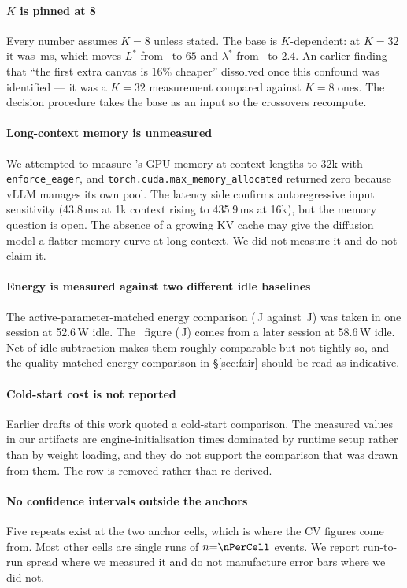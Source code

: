 \paragraph{$K$ is pinned at 8}
Every number assumes $K{=}8$ unless stated. The base is $K$-dependent: at
$K{=}32$ it was \dgOldBase\,ms, which moves $L^{*}$ from \crossoverL\ to $65$
and $\lambda^{*}$ from \crossoverLambda\ to $2.4$. An earlier finding that
``the first extra canvas is 16\% cheaper'' dissolved once this confound was
identified --- it was a $K{=}32$ measurement compared against $K{=}8$ ones.
The decision procedure takes the base as an input so the crossovers recompute.

\paragraph{Long-context memory is unmeasured}
We attempted to measure \ARoneb's GPU memory at context lengths to 32k with
\texttt{enforce\_eager}, and \texttt{torch.cuda.max\_memory\_allocated}
returned zero because vLLM manages its own pool. The latency side confirms
autoregressive input sensitivity (43.8\,ms at 1k context rising to 435.9\,ms
at 16k), but the memory question is open. The absence of a growing KV cache
may give the diffusion model a flatter memory curve at long context. We did
not measure it and do not claim it.

\paragraph{Energy is measured against two different idle baselines}
The active-parameter-matched energy comparison (\arThreeEnergy\,J against
\dgEnergy\,J) was taken in one session at 52.6\,W idle. The \ARoneb\ figure
(\arOneFiveEnergy\,J) comes from a later session at 58.6\,W idle. Net-of-idle
subtraction makes them roughly comparable but not tightly so, and the
quality-matched energy comparison in \S\ref{sec:fair} should be read as
indicative.

\paragraph{Cold-start cost is not reported}
Earlier drafts of this work quoted a cold-start comparison. The measured
values in our artifacts are engine-initialisation times dominated by runtime
setup rather than by weight loading, and they do not support the comparison
that was drawn from them. The row is removed rather than re-derived.

\paragraph{No confidence intervals outside the anchors}
Five repeats exist at the two anchor cells, which is where the CV figures come
from. Most other cells are single runs of $n{=}\nPerCell$ events. We report
run-to-run spread where we measured it and do not manufacture error bars where
we did not.
